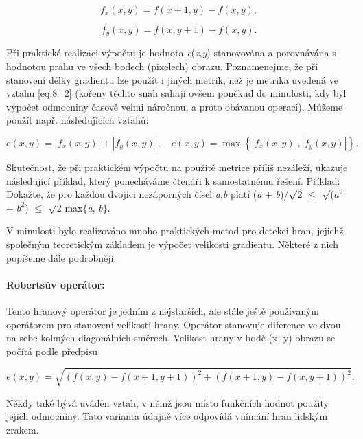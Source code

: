 \begin{equation} \label{eq:8_4}
    f_x(x, y) = f(x + 1, y) - f(x, y),
\end{equation}

\begin{equation} \label{eq:8_5}
    f_y(x, y) = f(x, y + 1) - f(x, y).
\end{equation}

Při praktické realizaci výpočtu je hodnota \textit{e}(\textit{x},\textit{y}) stanovována a porovnávána s hodnotou prahu ve všech bodech (pixelech) obrazu. Poznamenejme, že při stanovení délky gradientu lze použít i jiných metrik, než je metrika uvedená ve vztahu \eqref{eq:8_2} (kořeny těchto snah sahají ovšem poněkud do minulosti, kdy byl výpočet odmocniny časově velmi náročnou, a proto obávanou operací). Můžeme použít např. následujících vztahů:

\begin{equation} \label{eq:8_6}
    e(x, y) = | f_x(x, y) | + | f_y(x, y) |, \quad e(x, y) = \max \left\{ | f_x(x, y) |, | f_y(x, y) | \right\}.
\end{equation}

Skutečnost, že při praktickém výpočtu na použité metrice příliš nezáleží, ukazuje následující příklad, který ponecháváme čtenáři k samostatnému řešení. Příklad: Dokažte, že pro každou dvojici nezáporných čísel \textit{a},\textit{b} platí (\textit{a} + \textit{b})/$\surd$2 $\leq$ $\surd$($a^2$ + $b^2$) $\leq$ $\surd$2 max$\{$\textit{a}, \textit{b}$\}$. 

V minulosti bylo realizováno mnoho praktických metod pro detekci hran, jejichž společným teoretickým základem je výpočet velikosti gradientu. Některé z nich popíšeme dále podrobněji.

\paragraph{Robertsův operátor:} Tento hranový operátor je jedním z nejstarších, ale stále ještě používaným operátorem pro stanovení velikosti hrany. Operátor stanovuje diference ve dvou na sebe kolmých diagonálních směrech. Velikost hrany v bodě (x, y) obrazu se počítá podle předpisu

\begin{equation} \label{eq:8_7} 
    e(x,y)=\sqrt{\left(f(x,y)-f(x+1,y+1)\right)^{2} +\left(f(x+1,y)-f(x,y+1)\right)^{2} } .   
\end{equation}

Někdy také bývá uváděn vztah, v němž jsou místo funkčních hodnot použity jejich odmocniny. Tato varianta údajně více odpovídá vnímání hran lidským zrakem.

